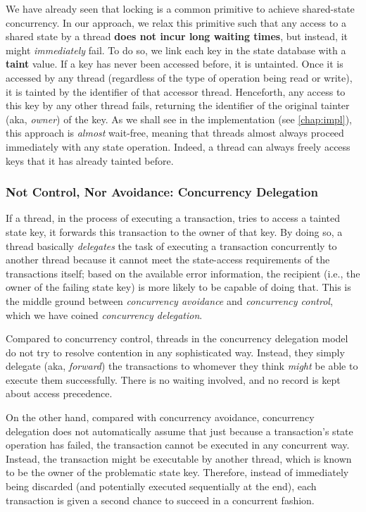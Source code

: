 We have already seen that locking is a common primitive to achieve shared-state concurrency. In our
approach, we relax this primitive such that any access to a shared state by a thread \textbf{does
not incur long waiting times}, but instead, it might \textit{immediately} fail. To do so, we link
each key in the state database with a \textbf{taint} value. If a key has never been accessed before,
it is untainted. Once it is accessed by any thread (regardless of the type of operation being read
or write), it is tainted by the identifier of that accessor thread. Henceforth, any access to this
key by any other thread fails, returning the identifier of the original tainter (aka,
\textit{owner}) of the key. As we shall see in the implementation (see \ref{chap:impl}), this
approach is \textit{almost} wait-free, meaning that threads almost always proceed immediately with
any state operation. Indeed, a thread can always freely access keys that it has already tainted
before.

\subsubsection{Not Control, Nor Avoidance: Concurrency Delegation}

If a thread, in the process of executing a transaction, tries to access a tainted state key, it
forwards this transaction to the owner of that key. By doing so, a thread basically
\textit{delegates} the task of executing a transaction concurrently to another thread because it
cannot meet the state-access requirements of the transactions itself; based on the available error
information, the recipient (i.e., the owner of the failing state key) is more likely to be capable
of doing that. This is the middle ground between \textit{concurrency avoidance} and
\textit{concurrency control}, which we have coined \textit{concurrency delegation}.

Compared to concurrency control, threads in the concurrency delegation model do not try to resolve
contention in any sophisticated way. Instead, they simply delegate (aka, \textit{forward}) the
transactions to whomever they think \textit{might} be able to execute them successfully. There is no
waiting involved, and no record is kept about access precedence.

On the other hand, compared with concurrency avoidance, concurrency delegation does not
automatically assume that just because a transaction's state operation has failed, the transaction
cannot be executed in any concurrent way. Instead, the transaction might be executable by another
thread, which is known to be the owner of the problematic state key. Therefore, instead of
immediately being discarded (and potentially executed sequentially at the end), each transaction is
given a second chance to succeed in a concurrent fashion.

